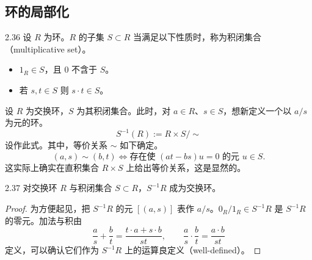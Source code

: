 
\subsection{环的局部化}

\begin{definition}{2.36} 设 $R$ 为环。$R$ 的子集 $S\subset R$ 当满足以下性质时，称为积闭集合（multiplicative set）。
\begin{itemize}
  \item $1_R\in S$，且 $0$ 不含于 $S$。
  \item 若 $s,t\in S$ 则 $s\cdot t\in S$。
\end{itemize}
\end{definition}

设 $R$ 为交换环，$S$ 为其积闭集合。此时，对 $a\in R$、$s\in S$，想新定义一个以 $a/s$ 为元的环。
\[
  S^{-1}(R) := R\times S/{\sim}
\]
设作此式。其中，等价关系 $\sim$ 如下确定。
\[
  (a,s)\sim(b,t) \iff \text{存在使 } (at-bs)u=0 \text{ 的元 } u\in S.
\]
这实际上确实在直积集合 $R\times S$ 上给出等价关系，这是显然的。


\begin{lemma}{2.37} 对交换环 $R$ 与积闭集合 $S\subset R$，$S^{-1}R$ 成为交换环。\end{lemma}

\begin{proof}
为方便起见，把 $S^{-1}R$ 的元 $[(a,s)]$ 表作 $a/s$。$0_R/1_R\in S^{-1}R$ 是 $S^{-1}R$ 的零元。加法与积由
\[
  \frac{a}{s}+\frac{b}{t}=\frac{t\cdot a+s\cdot b}{st},\qquad
  \frac{a}{s}\cdot\frac{b}{t}=\frac{a\cdot b}{st}
\]
定义，可以确认它们作为 $S^{-1}R$ 上的运算良定义（well-defined）。
\end{proof}


